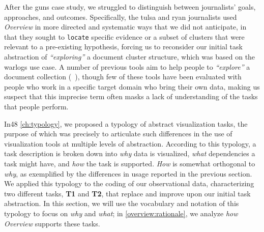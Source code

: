 After the {\sc guns} case study, we struggled to distinguish between journalists' goals, approaches, and outcomes.
Specifically, the {\sc tulsa} and {\sc ryan} journalists used {\it Overview} in more directed and systematic ways that we did not anticipate, in that they sought to {\tt locate} specific evidence or a subset of clusters that were relevant to a pre-existing hypothesis, forcing us to reconsider our initial task abstraction of {\it ``exploring''} a document cluster structure, which was based on the {\sc warlogs} use case.
A number of previous tools aim to help people to {\it ``explore''} a document collection (\eg~\cite{Chaney2012,Cui2011,Dou2013,Endert2012b}), though few of these tools have been evaluated with people who work in a specific target domain who bring their own data, making us suspect that this imprecise term often masks a lack of understanding of the tasks that people perform.

In48 \autoref{ch:typology}, we proposed a typology of abstract visualization tasks, the purpose of which was precisely to articulate such differences in the use of visualization tools at multiple levels of abstraction. 
According to this typology, a task description is broken down into {\it why} data is visualized, {\it what} dependencies a task might have, and {\it how} the task is supported.
{\it How} is somewhat orthogonal to {\it why}, as exemplified by the differences in usage reported in the previous section.
We applied this typology to the coding of our observational data, characterizing two different tasks, {\bf T1} and {\bf T2}, that replace and improve upon our initial task abstraction. 
In this section, we will use the vocabulary and notation of this typology to focus on {\it why} and {\it what}; in \autoref{overview:rationale}, we analyze {\it how} {\it Overview} supports these tasks.

